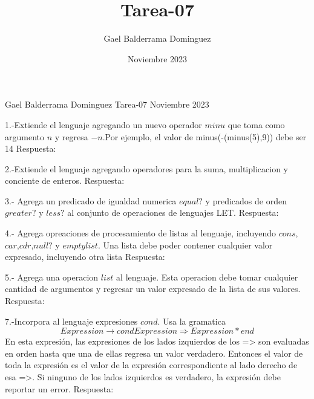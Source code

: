 \documentclass{article}
\author{Gael Balderrama Dominguez}
\title{Tarea-07}
\date{Noviembre 2023}
\begin{document}
\begin{center}
    Gael Balderrama Dominguez \linebreak
    Tarea-07 \linebreak
    Noviembre 2023 \linebreak
\end{center}
1.-Extiende el lenguaje agregando un nuevo operador $minu$ que toma como argumento $n$ y regresa $-n$.Por ejemplo, el valor de minus(-(minus(5),9)) debe ser 14 \newline
Respuesta: \newline

2.-Extiende el lenguaje agregando operadores para la suma, multiplicacion y conciente de enteros. \newline
Respuesta: \newline

3.- Agrega un predicado de igualdad numerica $equal?$ y predicados de orden $greater?$ y $less?$ al conjunto de operaciones de lenguajes LET.
Respuesta: \newline

4.- Agrega opreaciones de procesamiento de listas al lenguaje, incluyendo $cons$,$car$,$cdr$,$null?$ y $emptylist$. Una lista debe poder contener cualquier valor expresado, incluyendo otra lista
Respuesta: \newline

5.- Agrega una operacion $list$ al lenguaje. Esta operacion debe tomar cualquier cantidad de argumentos y regresar un valor expresado de la lista de sus valores.\newline
Respuesta: \newline

7.-Incorpora al lenguaje expresiones $cond$. Usa la gramatica 
$$ Expression \rightarrow cond {Expression \Rightarrow Expression}* end$$
En esta expresión, las expresiones de los lados izquierdos de los => son evaluadas en orden
hasta que una de ellas regresa un valor verdadero. Entonces el valor de toda la expresión es
el valor de la expresión correspondiente al lado derecho de esa =>. Si ninguno de los lados
izquierdos es verdadero, la expresión debe reportar un error.
Respuesta: \newline
\end{document}
